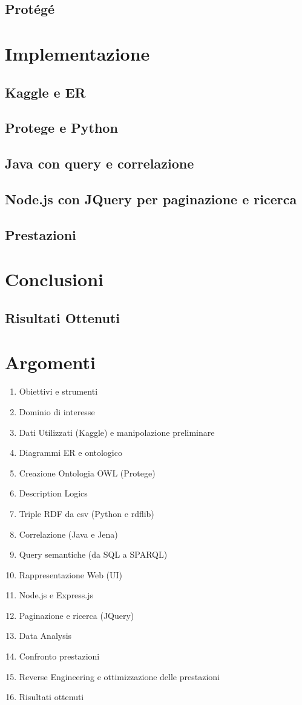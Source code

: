 \documentclass[Lau,binding=0.6cm,noexaminfo,oneside]{sapthesis}
\begin{document}
\section{Protégé}

\chapter{Implementazione}
\section{Kaggle e ER}
\section{Protege e Python}
\section{Java con query e correlazione}
\section{Node.js con JQuery per paginazione e ricerca}
\section{Prestazioni}

\chapter{Conclusioni}
\section{Risultati Ottenuti}


\chapter*{Argomenti}
\begin{enumerate}
  \item Obiettivi e strumenti
  \item Dominio di interesse
  \item Dati Utilizzati (Kaggle) e manipolazione preliminare
  \item Diagrammi ER e ontologico
  \item Creazione Ontologia OWL (Protege)
  \item Description Logics
  \item Triple RDF da csv (Python e rdflib)
  \item Correlazione (Java e Jena)
  \item Query semantiche (da SQL a SPARQL)
  \item Rappresentazione Web (UI)
  \item Node.js e Express.js
  \item Paginazione e ricerca (JQuery)
  \item Data Analysis
  \item Confronto prestazioni
  \item Reverse Engineering e ottimizzazione delle prestazioni
  \item Risultati ottenuti
\end{enumerate}

\backmatter
\cleardoublepage
\end{document}
